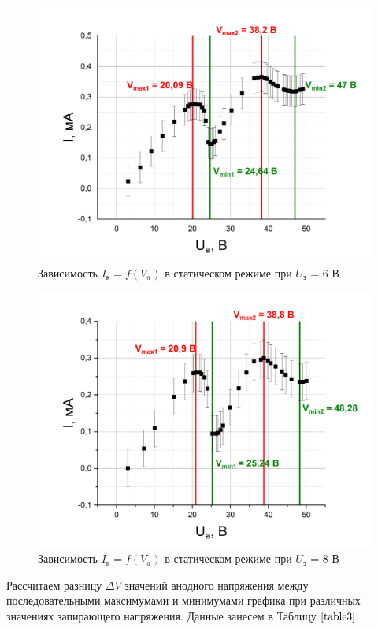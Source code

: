 \documentclass[a4paper,12pt]{article}
\begin{document}
\begin{figure}[h!]
	\centering
	\includegraphics[scale=0.5]{graph2}
	\caption{Зависимость $I_к = f(V_a)$ в статическом режиме при $U_з$ = 6 В}
	\label{graph2}
\end{figure}

\newpage

\begin{figure}[h!]
	\centering
	\includegraphics[scale=0.5]{graph3}
	\caption{Зависимость $I_к = f(V_a)$ в статическом режиме при $U_з$ = 8 В}
	\label{graph3}
\end{figure}

Рассчитаем разницу $\Delta V$ значений анодного напряжения между последовательными максимумами и минимумами графика при различных значениях запирающего напряжения. Данные занесем в Таблицу  $\ref{table3}$
\end{document}
